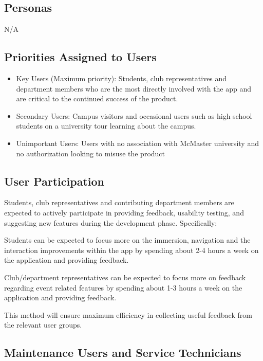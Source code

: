 \documentclass[12pt]{article}
\begin{document}
\subsection{Personas}
N/A
\subsection{Priorities Assigned to Users}

\begin{itemize}
\item Key Users (Maximum priority): Students, club representatives and department members who are the most directly involved with the app and are critical to the continued success of the product.

\item Secondary Users: Campus visitors and occasional users such as high school students on a university tour learning about the campus.

\item Unimportant Users: Users with no association with McMaster university and no authorization looking to misuse the product
\end{itemize}

\subsection{User Participation}

\quad Students, club representatives and contributing department members are expected to actively participate in providing feedback, usability testing, and suggesting new features during the development phase. Specifically:


Students can be expected to focus more on the immersion, navigation and the interaction improvements within the app by spending about 2-4 hours a week on the application and providing feedback.


Club/department representatives can be expected to focus more on feedback regarding event related features by spending about 1-3 hours a week on the application and providing feedback.


This method will ensure maximum efficiency in collecting useful feedback from the relevant user groups.

\subsection{Maintenance Users and Service Technicians}
\end{document}
